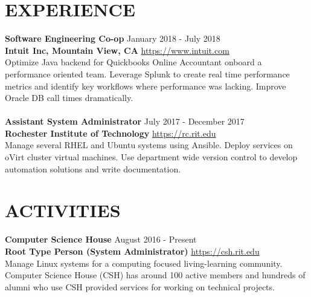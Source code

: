 \documentclass[line, margin, 11pt]{res}
\begin{document}
\begin{resume}
\section{EXPERIENCE}
{\bf \large{Software Engineering Co-op}} \hfill January 2018 - July 2018 \\
{\bf Intuit Inc, Mountain View, CA} \hfill \url{https://www.intuit.com} \\
Optimize Java backend for Quickbooks Online Accountant onboard a performance oriented team.  Leverage Splunk to create real
time performance metrics and identify key workflows where performance was lacking.  Improve Oracle DB call times dramatically.
\\
\\
{\bf \large{Assistant System Administrator}} \hfill July 2017 - December 2017 \\
{\bf Rochester Institute of Technology} \hfill \url{https://rc.rit.edu} \\
Manage several RHEL and Ubuntu systems using Ansible.  Deploy services on oVirt cluster virtual machines.  Use department wide version control to
develop automation solutions and write documentation.

\section{ACTIVITIES}
{\bf \large{Computer Science House}} \hfill August 2016 - Present \\
{\bf Root Type Person (System Administrator)} \hfill \url{https://csh.rit.edu} \\
Manage Linux systems for a computing focused living-learning community.
Computer Science House (CSH) has around 100 active members and hundreds of alumni
who use CSH provided services for working on technical projects.

\end{resume}
\end{document}
